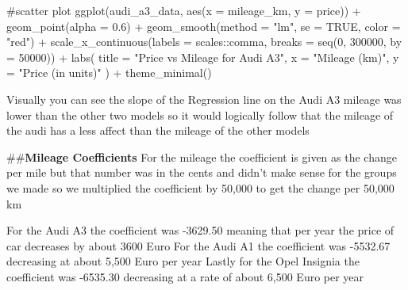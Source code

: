 \documentclass[
  letterpaper,
  DIV=11,
  numbers=noendperiod]{scrartcl}
\newenvironment{Shaded}{\begin{snugshade}}{\end{snugshade}}
\newcommand{\AttributeTok}[1]{\textcolor[rgb]{0.40,0.45,0.13}{#1}}
\newcommand{\CommentTok}[1]{\textcolor[rgb]{0.37,0.37,0.37}{#1}}
\newcommand{\ConstantTok}[1]{\textcolor[rgb]{0.56,0.35,0.01}{#1}}
\newcommand{\DecValTok}[1]{\textcolor[rgb]{0.68,0.00,0.00}{#1}}
\newcommand{\FloatTok}[1]{\textcolor[rgb]{0.68,0.00,0.00}{#1}}
\newcommand{\FunctionTok}[1]{\textcolor[rgb]{0.28,0.35,0.67}{#1}}
\newcommand{\NormalTok}[1]{\textcolor[rgb]{0.00,0.23,0.31}{#1}}
\newcommand{\SpecialCharTok}[1]{\textcolor[rgb]{0.37,0.37,0.37}{#1}}
\newcommand{\StringTok}[1]{\textcolor[rgb]{0.13,0.47,0.30}{#1}}
\begin{document}
\begin{Shaded}
\begin{Highlighting}[]
\CommentTok{\#scatter plot}
\FunctionTok{ggplot}\NormalTok{(audi\_a3\_data, }\FunctionTok{aes}\NormalTok{(}\AttributeTok{x =}\NormalTok{ mileage\_km, }\AttributeTok{y =}\NormalTok{ price)) }\SpecialCharTok{+}
  \FunctionTok{geom\_point}\NormalTok{(}\AttributeTok{alpha =} \FloatTok{0.6}\NormalTok{) }\SpecialCharTok{+}
  \FunctionTok{geom\_smooth}\NormalTok{(}\AttributeTok{method =} \StringTok{"lm"}\NormalTok{, }\AttributeTok{se =} \ConstantTok{TRUE}\NormalTok{, }\AttributeTok{color =} \StringTok{"red"}\NormalTok{) }\SpecialCharTok{+}
  \FunctionTok{scale\_x\_continuous}\NormalTok{(}\AttributeTok{labels =}\NormalTok{ scales}\SpecialCharTok{::}\NormalTok{comma, }\AttributeTok{breaks =} \FunctionTok{seq}\NormalTok{(}\DecValTok{0}\NormalTok{, }\DecValTok{300000}\NormalTok{, }\AttributeTok{by =} \DecValTok{50000}\NormalTok{)) }\SpecialCharTok{+}
  \FunctionTok{labs}\NormalTok{(}
    \AttributeTok{title =} \StringTok{"Price vs Mileage for Audi A3"}\NormalTok{,}
    \AttributeTok{x =} \StringTok{"Mileage (km)"}\NormalTok{,}
    \AttributeTok{y =} \StringTok{"Price (in units)"}
\NormalTok{  ) }\SpecialCharTok{+}
  \FunctionTok{theme\_minimal}\NormalTok{()}
\end{Highlighting}
\end{Shaded}

Visually you can see the slope of the Regression line on the Audi A3
mileage was lower than the other two models so it would logically follow
that the mileage of the audi has a less affect than the mileage of the
other models

\#\#\textbf{Mileage Coefficients} For the mileage the coefficient is
given as the change per mile but that number was in the cents and didn't
make sense for the groups we made so we multiplied the coefficient by
50,000 to get the change per 50,000 km

For the Audi A3 the coefficient was -3629.50 meaning that per year the
price of car decreases by about 3600 Euro For the Audi A1 the
coefficient was -5532.67 decreasing at about 5,500 Euro per year Lastly
for the Opel Insignia the coefficient was -6535.30 decreasing at a rate
of about 6,500 Euro per year
\end{document}
